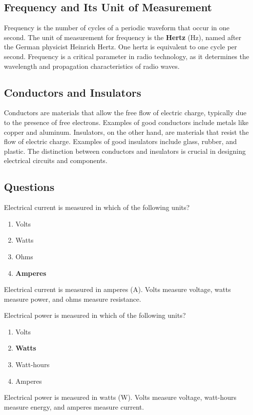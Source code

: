 \subsection*{Frequency and Its Unit of Measurement}
Frequency is the number of cycles of a periodic waveform that occur in one second. The unit of measurement for frequency is the \textbf{Hertz} (Hz), named after the German physicist Heinrich Hertz. One hertz is equivalent to one cycle per second. Frequency is a critical parameter in radio technology, as it determines the wavelength and propagation characteristics of radio waves.

\subsection*{Conductors and Insulators}
Conductors are materials that allow the free flow of electric charge, typically due to the presence of free electrons. Examples of good conductors include metals like copper and aluminum. Insulators, on the other hand, are materials that resist the flow of electric charge. Examples of good insulators include glass, rubber, and plastic. The distinction between conductors and insulators is crucial in designing electrical circuits and components.

\subsection*{Questions}
\begin{tcolorbox}[colback=gray!10!white,colframe=black!75!black,title={T5A01}]
Electrical current is measured in which of the following units?
\begin{enumerate}[label=\Alph*),noitemsep]
    \item Volts
    \item Watts
    \item Ohms
    \item \textbf{Amperes}
\end{enumerate}
\end{tcolorbox}
Electrical current is measured in amperes (A). Volts measure voltage, watts measure power, and ohms measure resistance.


\begin{tcolorbox}[colback=gray!10!white,colframe=black!75!black,title={T5A02}]
Electrical power is measured in which of the following units?
\begin{enumerate}[label=\Alph*),noitemsep]
    \item Volts
    \item \textbf{Watts}
    \item Watt-hours
    \item Amperes
\end{enumerate}
\end{tcolorbox}
Electrical power is measured in watts (W). Volts measure voltage, watt-hours measure energy, and amperes measure current.

